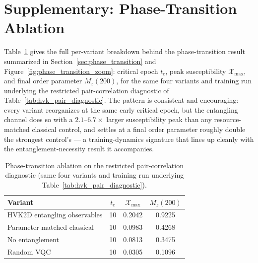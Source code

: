 \documentclass[journal]{IEEEtran}
\begin{document}
\section{Supplementary: Phase-Transition Ablation}
\label{app:phase_transition_ablation}
Table~\ref{tab:phase_transition_ablation} gives the full per-variant breakdown behind the phase-transition result summarized in Section~\ref{sec:phase_transition} and Figure~\ref{fig:phase_transition_zoom}: critical epoch $t_c$, peak susceptibility $\mathcal{X}_{\max}$, and final order parameter $M_z(200)$, for the same four variants and training run underlying the restricted pair-correlation diagnostic of Table~\ref{tab:hvk_pair_diagnostic}. The pattern is consistent and encouraging: every variant reorganizes at the same early critical epoch, but the entangling channel does so with a $2.1$--$6.7\times$ larger susceptibility peak than any resource-matched classical control, and settles at a final order parameter roughly double the strongest control's --- a training-dynamics signature that lines up cleanly with the entanglement-necessity result it accompanies.

\begin{table}[h]
\centering
\caption{Phase-transition ablation on the restricted pair-correlation diagnostic (same four variants and training run underlying Table~\ref{tab:hvk_pair_diagnostic}).}
\label{tab:phase_transition_ablation}
\scriptsize
\begin{tabular}{lccc}
\toprule
Variant & $t_c$ & $\mathcal{X}_{\max}$ & $M_z(200)$ \\
\midrule
HVK2D entangling observables & 10 & 0.2042 & 0.9225 \\
Parameter-matched classical & 10 & 0.0983 & 0.4268 \\
No entanglement & 10 & 0.0813 & 0.3475 \\
Random VQC & 10 & 0.0305 & 0.1096 \\
\bottomrule
\end{tabular}
\end{table}
\end{document}
